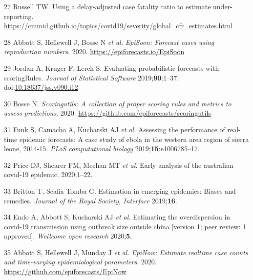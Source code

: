 \documentclass[]{article}
\begin{document}
\leavevmode\hypertarget{ref-Russell:BFVkJ6lQ}{}%
27 Russell TW. Using a delay-adjusted case fatality ratio to estimate
under-reporting.
\url{https://cmmid.github.io/topics/covid19/severity/global_cfr_estimates.html}

\leavevmode\hypertarget{ref-episoon}{}%
28 Abbott S, Hellewell J, Bosse N \emph{et al.} \emph{EpiSoon: Forecast
cases using reproduction numbers}. 2020.
\url{https://epiforecasts.io/EpiSoon}

\leavevmode\hypertarget{ref-scoringrules}{}%
29 Jordan A, Kruger F, Lerch S. Evaluating probabilistic forecasts with
scoringRules. \emph{Journal of Statistical Software}
2019;\textbf{90}:1--37.
doi:\href{https://doi.org/10.18637/jss.v090.i12}{10.18637/jss.v090.i12}

\leavevmode\hypertarget{ref-scoringutils}{}%
30 Bosse N. \emph{Scoringutils: A collection of proper scoring rules and
metrics to assess predictions}. 2020.
\url{https://github.com/epiforecasts/scoringutils}

\leavevmode\hypertarget{ref-Funk2019cc}{}%
31 Funk S, Camacho A, Kucharski AJ \emph{et al.} Assessing the
performance of real-time epidemic forecasts: A case study of ebola in
the western area region of sierra leone, 2014-15. \emph{PLoS
computational biology} 2019;\textbf{15}:e1006785--17.

\leavevmode\hypertarget{ref-Price:2020dh}{}%
32 Price DJ, Shearer FM, Meehan MT \emph{et al.} Early analysis of the
australian covid-19 epidemic. 2020;1--22.

\leavevmode\hypertarget{ref-Britton:2019gf}{}%
33 Britton T, Scalia Tomba G. Estimation in emerging epidemics: Biases
and remedies. \emph{Journal of the Royal Society, Interface}
2019;\textbf{16}.

\leavevmode\hypertarget{ref-10.12688ux2fwellcomeopenres.15842.1}{}%
34 Endo A, Abbott S, Kucharski AJ \emph{et al.} Estimating the
overdispersion in covid-19 transmission using outbreak size outside
china {[}version 1; peer review: 1 approved{]}. \emph{Wellcome open
research} 2020;\textbf{5}.

\leavevmode\hypertarget{ref-epinow}{}%
35 Abbott S, Hellewell J, Munday J \emph{et al.} \emph{EpiNow: Estimate
realtime case counts and time-varying epidemiological parameters}. 2020.
\url{https://github.com/epiforecasts/EpiNow}
\end{document}
